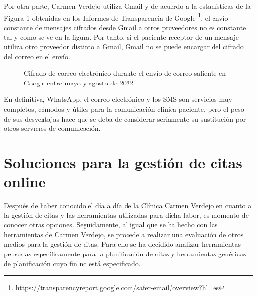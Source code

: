 Por otra parte, Carmen Verdejo utiliza Gmail y de acuerdo a la estadísticas de la Figura \ref{fig:cifrado-correo} obtenidas en los Informes de Transparencia de Google \footnote{\url{https://transparencyreport.google.com/safer-email/overview?hl=es}}, el envío constante de mensajes cifrados desde Gmail a otros proveedores no es constante tal y como se ve en la figura. Por tanto, si el paciente receptor de un mensaje utiliza otro proveedor distinto a Gmail, Gmail no se puede encargar del cifrado del correo en el envío.

\begin{figure}[H]
    \caption{Cifrado de correo electrónico durante el envío de correo saliente en Google entre mayo y agosto de 2022}
    \label{fig:cifrado-correo}
\end{figure}

En definitiva, WhatsApp, el correo electrónico y los SMS son servicios muy completos, cómodos y útiles para la comunicación clínica-paciente, pero el peso de sus desventajas hace que se deba de considerar seriamente su sustitución por otros servicios de comunicación. 

\section{Soluciones para la gestión de citas online}
Después de haber conocido el día a día de la Clínica Carmen Verdejo en cuanto a la gestión de citas y las herramientas utilizadas para dicha labor, es momento de conocer otras opciones. Seguidamente, al igual que se ha hecho con las herramientas de Carmen Verdejo, se procede a realizar una evaluación de otros medios para la gestión de citas. Para ello se ha decidido analizar herramientas pensadas específicamente para la planificación de citas y herramientas genéricas de planificación cuyo fin no está especificado.

